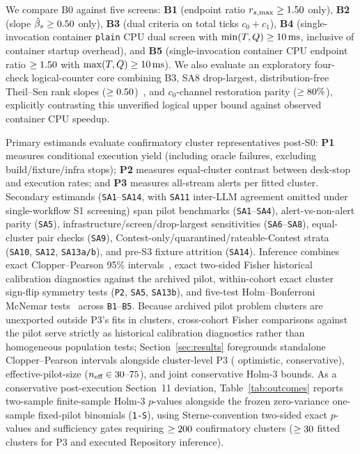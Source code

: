 \documentclass[11pt]{article}
\begin{document}
We compare B0 against five screens: \textbf{B1} (endpoint ratio $r_{s,\max} \ge 1.50{}$ only), \textbf{B2} (slope $\hat{\beta}_s \ge 0.50{}$ only), \textbf{B3} (dual criteria on total ticks $c_0 + c_1$), \textbf{B4} (single-invocation container \texttt{plain} CPU dual screen with $\min(T,Q) \ge 10\,\text{ms}{}$, inclusive of \BenchBwrapOverheadMs{} container startup overhead), and \textbf{B5} (single-invocation container CPU endpoint ratio $\ge 1.50{}$ with $\max(T,Q) \ge 10\,\text{ms}{}$).
We also evaluate an exploratory four-check logical-counter core combining B3, SA8 drop-largest, distribution-free Theil--Sen rank slopes ($\ge 0.50{}$)~\cite{theil1950rank,sen1968estimates}, and $c_0$-channel restoration parity ($\ge 80\%{}$), explicitly contrasting this unverified logical upper bound against observed container CPU speedup.

Primary estimands evaluate confirmatory cluster representatives post-S0: \textbf{P1} measures conditional execution yield (including oracle failures, excluding build/fixture/infra stops); \textbf{P2} measures equal-cluster contrast between desk-stop and execution rates; and \textbf{P3} measures all-stream alerts per fitted cluster.
Secondary estimands (\texttt{SA1}--\texttt{SA14}, with \texttt{SA11} inter-LLM agreement omitted under single-workflow S1 screening) span pilot benchmarks (\texttt{SA1}--\texttt{SA4}), alert-vs-non-alert parity (\texttt{SA5}), infrastructure/screen/drop-largest sensitivities (\texttt{SA6}--\texttt{SA8}), equal-cluster pair checks (\texttt{SA9}), Contest-only/quarantined/rateable-Contest strata (\texttt{SA10}, \texttt{SA12}, \texttt{SA13a/b}), and pre-S3 fixture attrition (\texttt{SA14}).
Inference combines exact Clopper--Pearson 95\% intervals~\cite{clopper1934use}, exact two-sided Fisher historical calibration diagnostics against the archived pilot, within-cohort exact cluster sign-flip symmetry tests (\texttt{P2}, \texttt{SA5}, \texttt{SA13b}), and five-test Holm--Bonferroni McNemar tests~\cite{mcnemar1947note,holm1979simple} across \texttt{B1}--\texttt{B5}.
Because archived pilot problem clusters are unexported outside P3's \BenchPilotFitN{} fits in \BenchPilotFitClustersN{} clusters, cross-cohort Fisher comparisons against the pilot serve strictly as historical calibration diagnostics rather than homogeneous population tests; Section~\ref{sec:results} foregrounds standalone Clopper--Pearson intervals alongside cluster-level P3 (\BenchPilotFitClustersFrac{} optimistic, \BenchPilotConservFrac{} conservative), effective-pilot-size ($n_{\text{eff}} \in 30\text{--}75{}$), and joint conservative Holm-3 bounds.
As a conservative post-execution Section~11 deviation, Table~\ref{tab:outcomes} reports two-sample finite-sample Holm-3 $p$-values alongside the frozen zero-variance one-sample fixed-pilot binomials (\texttt{1-S}), using Sterne-convention two-sided exact $p$-values and sufficiency gates requiring $\ge 200{}$ confirmatory clusters ($\ge 30{}$ fitted clusters for P3 and executed Repository inference).
\end{document}
